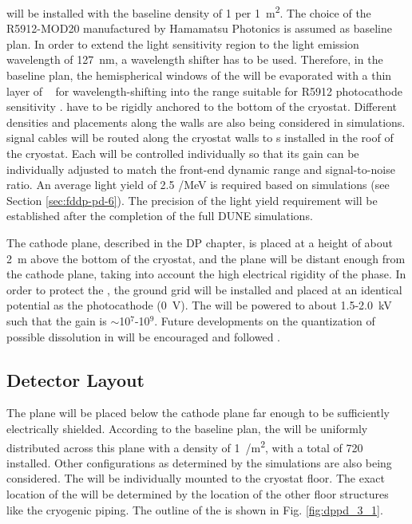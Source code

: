 will be installed with the baseline density of \num{1} per \SI{1}{m^2}. The choice of the R5912-MOD20  manufactured by Hamamatsu Photonics \cite{hamamatsu-5912} is assumed as baseline plan. In order to extend the  light sensitivity region to the \lar light emission wavelength of \SI{127}{nm}, a wavelength shifter has to be used. Therefore, in the baseline plan, the hemispherical windows of the  will be evaporated with a thin layer of ~\cite{tpb} for wavelength-shifting into the range suitable for R5912  photocathode sensitivity \cite{hamamatsu-5912}.  have to be rigidly anchored to the bottom of the cryostat. Different  densities and placements along the walls are also being considered in simulations.  signal cables will be routed along the cryostat walls to \fdth{}s installed in the roof of the cryostat. Each  will be controlled individually so that its gain can be individually adjusted to match the front-end dynamic range and signal-to-noise ratio. An average light yield of 2.5 \phel/MeV is required based on  simulations (see Section \ref{sec:fddp-pd-6}). The precision of the light yield requirement will be established after the completion of the full DUNE simulations.

The cathode plane, described in the  DP chapter,  is placed at a height of about \SI{2}{m} above the bottom of the cryostat, and the  plane will be distant enough from the cathode plane, taking into account the high electrical rigidity of the \lar phase. In order to protect the , the ground grid will be installed and placed at an identical potential as the  photocathode (\SI{0}{V}). The  will be powered to about \num{1.5}-\SI{2.0}{kV} such that the  gain is $\sim$\num{10}$^7$-\num{10}$^9$. Future developments on the quantization of possible  dissolution in \lar will be encouraged and followed \cite{TPBdiss}.

\subsection{Detector Layout}
\label{sec:fddp-pd-1.4}

The  plane will be placed below the cathode plane far enough to be sufficiently electrically shielded. According to the baseline plan, the  will be uniformly distributed across this plane with a density of \SI{1}{/m^2}, with a total of \num{720}  installed. Other  configurations as determined by the simulations are also being considered. The  will be individually mounted to the cryostat floor. The exact location of the  will be determined by the location of the other floor structures like the cryogenic piping. The outline of the  is shown in Fig. \ref{fig:dppd_3_1}.

